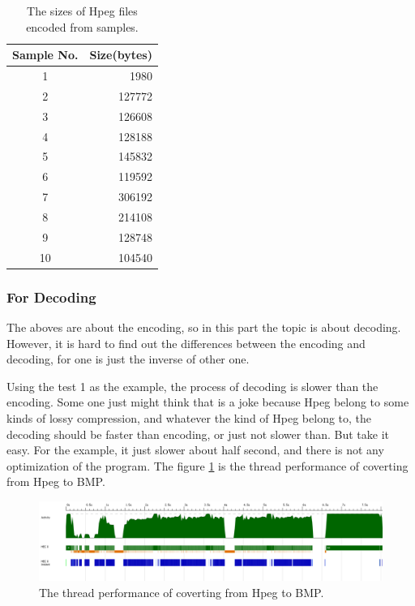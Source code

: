\documentclass{article}
\begin{document}
\begin{table}
    \centering
    \caption{The sizes of Hpeg files encoded from samples.}
    \begin{tabular}{|c|r|}
        \hline Sample No. & Size(bytes) \\
        \hline 1  &    1980 \\
        \hline 2  &  127772 \\
        \hline 3  &  126608 \\
        \hline 4  &  128188 \\
        \hline 5  &  145832 \\
        \hline 6  &  119592 \\
        \hline 7  &  306192 \\
        \hline 8  &  214108 \\
        \hline 9  &  128748 \\
        \hline 10 &  104540 \\
        \hline 
    \end{tabular} 
    \label{tab:compression:size}
\end{table}

\subsubsection{For Decoding}
\label{sec:hpeg:performance:decode}

The aboves are about the encoding, so in this part the topic is about decoding.
However, it is hard to find out the differences between the encoding and decoding,
for one is just the inverse of other one.

Using the test 1 as the example, the process of decoding is slower than the encoding.
Some one just might think that is a joke because Hpeg belong to some kinds of lossy compression,
and whatever the kind of Hpeg belong to, the decoding should be faster than encoding,
or just not slower than. But take it easy. For the example, it just slower about half second,
and there is not any optimization of the program. The figure \ref{fig:fin-test1} is the thread
performance of coverting from Hpeg to BMP.

\begin{figure}
\centering
\includegraphics[width=1\linewidth]{fin-test1.hb.png}
\caption{The thread performance of coverting from Hpeg to BMP.}
\label{fig:fin-test1}
\end{figure}
\end{document}
